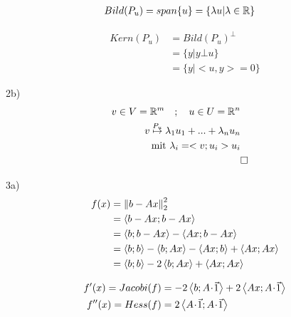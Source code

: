 \begin{equation}\begin{split}
	Bild(P_u) &= span\{u\} = \{\lambda u| \lambda \in {\mathbb R}\}
\end{split}\end{equation}

\begin{equation}\begin{split}
	Kern(P_u) &= Bild(P_u)^{\bot}\\
	&= \{y | y \bot u\}\\
	&= \{y | <u,y> = 0\}
\end{split}\end{equation}

2b)
\begin{equation}\begin{split}
	v \in V = \R^m \quad ; \quad u \in U = \R^n\\
	v \stackrel{P_u}{\mapsto} \lambda_1u_1 + ... + \lambda_nu_n \\ %
	\text{mit } \lambda_i = <v; u_i>u_i\\
	&\square
\end{split}\end{equation}

3a)
\begin{equation}\begin{split}
	f(x) &= \left\lVert b-Ax\right\rVert_2^2 \\
	&= \left\langle b-Ax;b-Ax\right\rangle  \\
	&= \left\langle b;b-Ax\right\rangle - \left\langle Ax;b-Ax\right\rangle \\
	&= \left\langle b;b\right\rangle - \left\langle b;Ax\right\rangle -\left\langle Ax;b\right\rangle + \left\langle Ax;Ax\right\rangle \\
	&= \left\langle b;b\right\rangle -2\left\langle b;Ax\right\rangle + \left\langle Ax;Ax\right\rangle \\
\end{split}\end{equation}

\begin{equation}\begin{split}
	f'(x) = Jacobi(f) &= -2\scalprod{b}{A \scdot \vec{1}}  + 2\scalprod{Ax}{A\scdot \vec{1}}\\
	f''(x) = Hess(f) &= 2\scalprod{A \scdot \vec{1}}{A \scdot \vec{1}}\\
\end{split}\end{equation}



